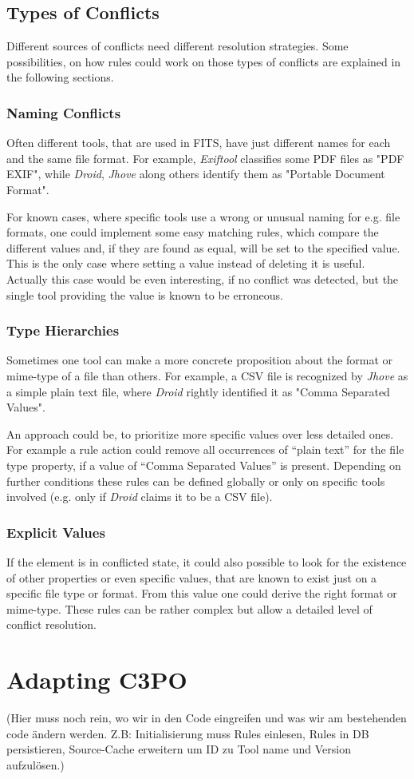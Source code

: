 \documentclass[a4paper,12pt]{article}
\begin{document}
\subsection{Types of Conflicts}
Different sources of conflicts need different resolution strategies. Some possibilities, on how rules could work on those types of conflicts are explained in the following sections.

\subsubsection{Naming Conflicts}

Often different tools, that are used in FITS, have just different names for each and the same file format. For example, \emph{Exiftool} classifies some PDF files as "PDF EXIF", while \emph{Droid}, \emph{Jhove} along others identify them as "Portable Document Format".

For known cases, where specific tools use a wrong or unusual naming for e.g. file formats, one could implement some easy matching rules, which compare the different values and, if they are found as equal, will be set to the specified value. This is the only case where setting a value instead of deleting it is useful. Actually this case would be even interesting, if no conflict was detected, but the single tool providing the value is known to be erroneous.

\subsubsection{Type Hierarchies}

Sometimes one tool can make a more concrete proposition about the format or mime-type of a file than others. For example, a CSV file is recognized by \emph{Jhove} as a simple plain text file, where \emph{Droid} rightly identified it as "Comma Separated Values".

An approach could be, to prioritize more specific values over less detailed ones. For example a rule action could remove all occurrences of ``plain text'' for the file type property, if a value of ``Comma Separated Values'' is present. Depending on further conditions these rules can be defined globally or only on specific tools involved (e.g. only if \emph{Droid} claims it to be a CSV file).

\subsubsection{Explicit Values}
If the element is in conflicted state, it could also possible to look for the existence of other properties or even specific values, that are known to exist just on a specific file type or format. From this value one could derive the right format or mime-type. These rules can be rather complex but allow a detailed level of conflict resolution.

\section{Adapting C3PO}
(Hier muss noch rein, wo wir in den Code eingreifen und was wir am bestehenden code ändern werden. Z.B: Initialisierung muss Rules einlesen, Rules in DB persistieren, Source-Cache erweitern um ID zu Tool name und Version aufzulösen.)
\end{document}
